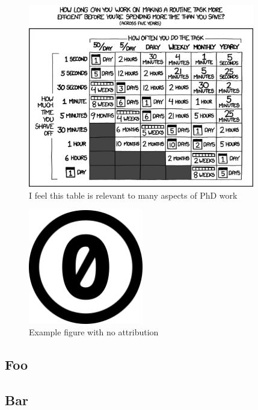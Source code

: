 \begin{figure}[h!]
	\centering
	\captionsetup{justification=centering}
	\includegraphics[height=8cm]{images/examples/xkcd_1205_is_it_worth_the_time_2x.png}
	\caption[Example figure B]{I feel this table is relevant to many aspects of PhD work\protect\footnotemark}
	\label{fig:example.b}
\end{figure}

\lipsum[4]

\begin{figure}[h!]
	\centering
	\captionsetup{justification=centering}
	\includegraphics[height=5cm]{images/examples/cc-zero.png}
	\caption{Example figure with no attribution}
	\label{fig:example.c}
\end{figure}


\subsection{Foo}
\label{subsec:example.another_foo}

\lipsum[5-6]


\subsection{Bar}
\label{subsec:example.another_bar}

